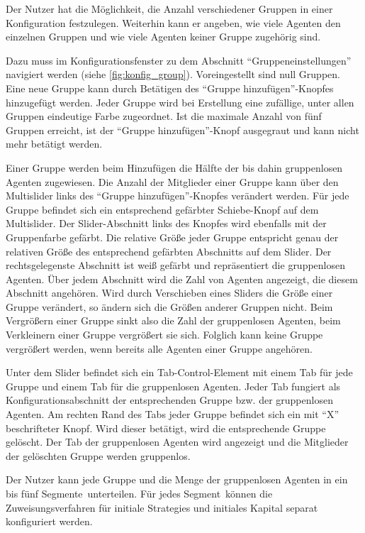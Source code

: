 \documentclass[parskip=full,11pt]{scrartcl}
\def\segment{Segment}
\def\segments{Segmente}
\begin{document}
Der \Gls{Nutzer} hat die Möglichkeit, die Anzahl verschiedener Gruppen in einer \Gls{Konfiguration} festzulegen. Weiterhin kann er angeben, wie viele Agenten den einzelnen Gruppen und wie viele Agenten keiner Gruppe zugehörig sind.

Dazu muss im Konfigurationsfenster zu dem Abschnitt \enquote{Gruppeneinstellungen} navigiert werden (siehe \cref{fig:konfig_group}). Voreingestellt sind null Gruppen. Eine neue Gruppe kann durch Betätigen des \enquote{Gruppe hinzufügen}-Knopfes hinzugefügt werden. Jeder Gruppe wird bei Erstellung eine zufällige, unter allen Gruppen eindeutige Farbe zugeordnet. Ist die maximale Anzahl von fünf Gruppen erreicht, ist der \enquote{Gruppe hinzufügen}-Knopf ausgegraut und kann nicht mehr betätigt werden.

Einer Gruppe werden beim Hinzufügen die Hälfte der bis dahin gruppenlosen Agenten zugewiesen. Die Anzahl der Mitglieder einer Gruppe kann über den \Gls{Multislider} links des \enquote{Gruppe hinzufügen}-Knopfes verändert werden. Für jede Gruppe befindet sich ein entsprechend gefärbter Schiebe-Knopf auf dem \Gls{Multislider}. Der \Gls{Slider-Abschnitt} links des Knopfes wird ebenfalls mit der Gruppenfarbe gefärbt. Die relative Größe jeder Gruppe entspricht genau der relativen Größe des entsprechend gefärbten Abschnitts auf dem Slider. Der rechtsgelegenste Abschnitt ist weiß gefärbt und repräsentiert die gruppenlosen Agenten. Über jedem Abschnitt wird die Zahl von Agenten angezeigt, die diesem Abschnitt angehören. Wird durch Verschieben eines Sliders die Größe einer Gruppe verändert, so ändern sich die Größen anderer Gruppen nicht. Beim Vergrößern einer Gruppe sinkt also die Zahl der gruppenlosen Agenten, beim Verkleinern einer Gruppe vergrößert sie sich. Folglich kann keine Gruppe vergrößert werden, wenn bereits alle Agenten einer Gruppe angehören.

Unter dem Slider befindet sich ein Tab-Control-Element mit einem Tab für jede Gruppe und einem Tab für die gruppenlosen Agenten. Jeder Tab fungiert als Konfigurationsabschnitt der entsprechenden Gruppe bzw. der gruppenlosen Agenten. Am rechten Rand des Tabs jeder Gruppe befindet sich ein mit \enquote{X} beschrifteter Knopf. Wird dieser betätigt, wird die entsprechende Gruppe gelöscht. Der Tab der gruppenlosen Agenten wird angezeigt und die Mitglieder der gelöschten Gruppe werden gruppenlos.

\functionality{Einteilung von Gruppen in \segments}{fnc:segments}
Der \Gls{Nutzer} kann jede Gruppe und die Menge der gruppenlosen Agenten in ein bis fünf \segments\ unterteilen. Für jedes \segment\ können die Zuweisungsverfahren für initiale \Glspl{Strategie} und initiales \Gls{Kapital} separat konfiguriert werden.
\end{document}
